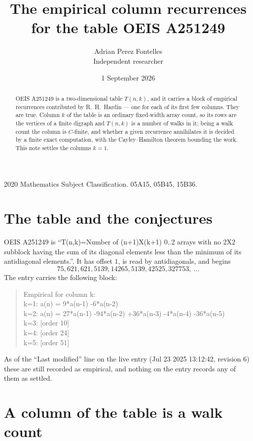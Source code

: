 \documentclass[11pt,a4paper]{article}
\title{The empirical column recurrences for the table OEIS A251249}
\author{Adrian Perez Fontelles\\ \small Independent researcher}
\date{1 September 2026}
\theoremstyle{plain}
\theoremstyle{definition}
\begin{document}
\maketitle

\begin{abstract}
OEIS A251249 is a two-dimensional table $T(n,k)$, and it carries a block of empirical
recurrences contributed by R.~H.~Hardin --- one for each of its first few columns. They are
true. Column $k$ of the table is an ordinary fixed-width array count, so its rows are the
vertices of a finite digraph and $T(n,k)$ is a number of walks in it; being a walk count the
column is $C$-finite, and whether a given recurrence annihilates it is decided by a finite
exact computation, with the Cayley--Hamilton theorem bounding the work. This note settles the columns $k=1$.
\end{abstract}

\noindent\small 2020 Mathematics Subject Classification. 05A15, 05B45, 15B36.\normalsize

\section{The table and the conjectures}

OEIS A251249 is ``T(n,k)=Number of (n+1)X(k+1) 0..2 arrays with no 2X2 subblock having the sum of its diagonal elements less than the minimum of its antidiagonal elements.''. It has offset $1$, is
read by antidiagonals, and begins
\[
75, 621, 621, 5139, 14265, 5139, 42525, 327753,\ \dots
\]
The entry carries the following block:
\begin{quote}\small
Empirical for column k:\\
k=1: a(n) = 9*a(n-1) -6*a(n-2)\\
k=2: a(n) = 27*a(n-1) -94*a(n-2) +36*a(n-3) -4*a(n-4) -36*a(n-5)\\
k=3: [order 10]\\
k=4: [order 24]\\
k=5: [order 51]\\
\end{quote}
As of the ``Last modified'' line on the live entry (Jul 23 2025 13:12:42, revision 6) these are still
recorded as empirical, and nothing on the entry records any of them as settled.

\section{A column of the table is a walk count}
\end{document}
